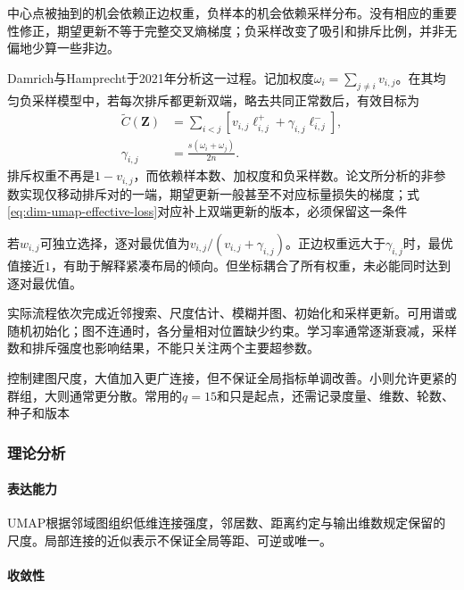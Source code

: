 中心点被抽到的机会依赖正边权重，负样本的机会依赖采样分布。没有相应的重要性修正，期望更新不等于完整交叉熵梯度；负采样改变了吸引和排斥比例，并非无偏地少算一些非边。

Damrich与Hamprecht于2021年分析这一过程。记加权度$\omega_i=\sum_{j\ne i}v_{i,j}$。在其均匀负采样模型中，若每次排斥都更新双端，略去共同正常数后，有效目标为
\begin{equation}
  \label{eq:dim-umap-effective-loss}
  \begin{aligned}
    \widetilde C(\bm{Z})
      &=\sum_{i<j}\left[
        v_{i,j}\ell^+_{i,j}
        +\gamma_{i,j}\ell^-_{i,j}\right],\\
    \gamma_{i,j}&=\frac{s(\omega_i+\omega_j)}{2n}.
  \end{aligned}
\end{equation}
排斥权重不再是$1-v_{i,j}$，而依赖样本数、加权度和负采样数。论文所分析的非参数实现仅移动排斥对的一端，期望更新一般甚至不对应标量损失的梯度；式\eqref{eq:dim-umap-effective-loss}对应补上双端更新的版本，必须保留这一条件

若$w_{i,j}$可独立选择，逐对最优值为$v_{i,j}/(v_{i,j}+\gamma_{i,j})$。正边权重远大于$\gamma_{i,j}$时，最优值接近$1$，有助于解释紧凑布局的倾向。但坐标耦合了所有权重，未必能同时达到逐对最优值。

实际流程依次完成近邻搜索、尺度估计、模糊并图、初始化和采样更新。可用谱或随机初始化；图不连通时，各分量相对位置缺少约束。学习率通常逐渐衰减，采样数和排斥强度也影响结果，不能只关注两个主要超参数。

控制建图尺度，大值加入更广连接，但不保证全局指标单调改善。小则允许更紧的群组，大则通常更分散。常用的$q=15$和只是起点，还需记录度量、维数、轮数、种子和版本

\subsubsection{理论分析}
\label{sec:dim-umap-theory}

\paragraph{表达能力}
UMAP根据邻域图组织低维连接强度，邻居数、距离约定与输出维数规定保留的尺度。局部连接的近似表示不保证全局等距、可逆或唯一。

\paragraph{收敛性}

